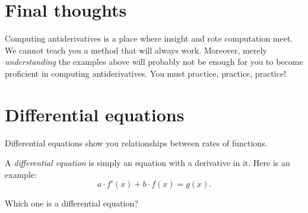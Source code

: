 \documentclass{ximera}
\begin{document}
\section{Final thoughts}
Computing antiderivatives is a place where insight and rote
computation meet. We cannot teach you a method that will always
work. Moreover, merely \emph{understanding} the examples above will
probably not be enough for you to become proficient in computing
antiderivatives. You must practice, practice, practice!

\section{Differential equations}

  Differential equations show you relationships between rates of
  functions.



A \textit{differential equation} is
simply an equation with a derivative in it. Here is an example:
\[
a\cdot f'(x)+ b\cdot f(x) = g(x). 
\]
\begin{question}
 Which one is a differential equation?
  \begin{multipleChoice}
  \end{multipleChoice}
\end{question}
\end{document}
